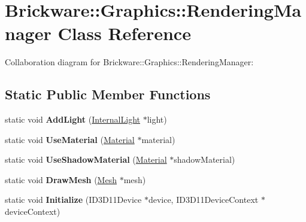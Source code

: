 \hypertarget{classBrickware_1_1Graphics_1_1RenderingManager}{}\section{Brickware\+:\+:Graphics\+:\+:Rendering\+Manager Class Reference}
\label{classBrickware_1_1Graphics_1_1RenderingManager}


Collaboration diagram for Brickware\+:\+:Graphics\+:\+:Rendering\+Manager\+:
\subsection*{Static Public Member Functions}
\begin{DoxyCompactItemize}
\item 
\hypertarget{classBrickware_1_1Graphics_1_1RenderingManager_aeac7aabe7ff044a16439959cc885d7fd}{}static void {\bfseries Add\+Light} (\hyperlink{classBrickware_1_1Graphics_1_1InternalLight}{Internal\+Light} $\ast$light)\label{classBrickware_1_1Graphics_1_1RenderingManager_aeac7aabe7ff044a16439959cc885d7fd}

\item 
\hypertarget{classBrickware_1_1Graphics_1_1RenderingManager_ae5a05d96702f3cb9dcab5623569a7e3f}{}static void {\bfseries Use\+Material} (\hyperlink{classBrickware_1_1Graphics_1_1Material}{Material} $\ast$material)\label{classBrickware_1_1Graphics_1_1RenderingManager_ae5a05d96702f3cb9dcab5623569a7e3f}

\item 
\hypertarget{classBrickware_1_1Graphics_1_1RenderingManager_a1eaaadcfa38f3fa01db3cb3e3a3d0f13}{}static void {\bfseries Use\+Shadow\+Material} (\hyperlink{classBrickware_1_1Graphics_1_1Material}{Material} $\ast$shadow\+Material)\label{classBrickware_1_1Graphics_1_1RenderingManager_a1eaaadcfa38f3fa01db3cb3e3a3d0f13}

\item 
\hypertarget{classBrickware_1_1Graphics_1_1RenderingManager_af309f2b8d9bb9b913dba15a4fc9f1d3a}{}static void {\bfseries Draw\+Mesh} (\hyperlink{classBrickware_1_1Graphics_1_1Mesh}{Mesh} $\ast$mesh)\label{classBrickware_1_1Graphics_1_1RenderingManager_af309f2b8d9bb9b913dba15a4fc9f1d3a}

\item 
\hypertarget{classBrickware_1_1Graphics_1_1RenderingManager_ae35d4d53742208d54f90f86aef0cd752}{}static void {\bfseries Initialize} (I\+D3\+D11\+Device $\ast$device, I\+D3\+D11\+Device\+Context $\ast$device\+Context)\label{classBrickware_1_1Graphics_1_1RenderingManager_ae35d4d53742208d54f90f86aef0cd752}


\end{DoxyCompactItemize}
